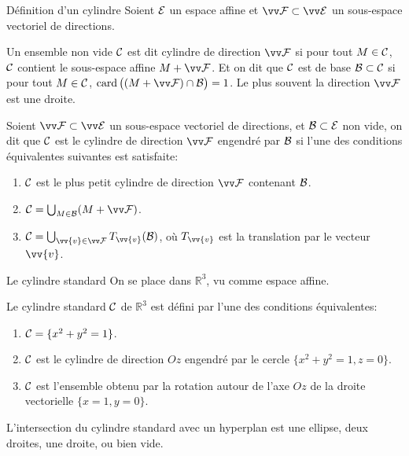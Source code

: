 \documentclass[11pt]{m53beamer}
\begin{document}
\begin{frame}{Définition d'un cylindre}
  Soient $\mathcal{E}$ un espace affine et $\ev{F} \subset \ev{E}$ un sous-espace vectoriel de directions.\pause
  \begin{definition}
    Un ensemble non vide $\mathcal{C}$ est dit \alert{cylindre de direction $\ev{F}$} si pour tout $M \in \mathcal{C}$, $\mathcal{C}$ contient le sous-espace affine $M+\ev{F}$.\pause{} Et on dit que $\mathcal{C}$ est de \alert{base} $\mathcal{B} \subset \mathcal{C}$ si pour tout $M \in \mathcal{C}$, $\card\big( (M+\ev{F}) \cap \ens{B}\big)=1$.\pause\newline
    Le plus souvent la direction $\ev{F}$ est une droite.
  \end{definition}\pause
  \begin{defprop}
    Soient $\ev{F} \subset \ev{E}$ un sous-espace vectoriel de directions, et $\mathcal{B} \subset \mathcal{E}$ non vide, on dit que $\mathcal{C}$ est \alert{le cylindre de direction $\ev{F}$ engendré par $\mathcal{B}$} si l'une des conditions équivalentes suivantes est satisfaite:
    \begin{enumerate}[<+(1)->]
         \item $\mathcal{C}$ est le plus petit cylindre de direction $\ev{F}$ contenant $\mathcal{B}$.
         \item $\ens{C}=\bigcup_{M \in \ens{B}} (M+\ev{F})$.
         \item $\ens{C}=\bigcup_{\vv{v} \in \ev{F}} T_{\vv{v}}(\ens{B})$, où $T_{\vv{v}}$ est la translation par le vecteur $\vv{v}$.
       \end{enumerate}
  \end{defprop}
\end{frame}
\begin{frame}{Le cylindre standard}
  On se place dans $\mathbb{R}^{3}$, vu comme espace affine.
  \begin{defprop}
    \alert{Le cylindre standard} $\mathcal{C}$ de $\mathbb{R}^{3}$ est défini par l'une des conditions équivalentes:
    \begin{enumerate}[<+(1)->]
      \item $\mathcal{C}=\{x^{2}+y^{2}=1\}$.
      \item $\mathcal{C}$ est le cylindre de direction $Oz$ engendré par le cercle $\{x^{2}+y^{2}=1, z=0\}$.
      \item $\mathcal{C}$ est l'ensemble obtenu par la rotation autour de l'axe $Oz$ de la droite vectorielle $\{x=1, y=0\}$.
    \end{enumerate}
  \end{defprop}\pause
  L'intersection du cylindre standard avec un hyperplan est une ellipse\pause, deux droites\pause, une droite\pause, ou bien vide.
\end{frame}
\end{document}
